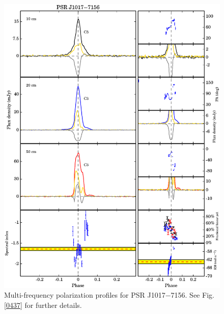\documentclass[useAMS,usenatbib]{mn2e}
\begin{document}
\begin{appendix}
\begin{figure}
\begin{center}
\includegraphics[width=6 in]{1017.ps}
\caption{Multi-frequency polarization profiles for PSR J1017$-$7156. 
See Fig. \ref{0437} for further details.}
\label{1017}
\end{center}
\end{figure}


\end{appendix}
\end{document}
